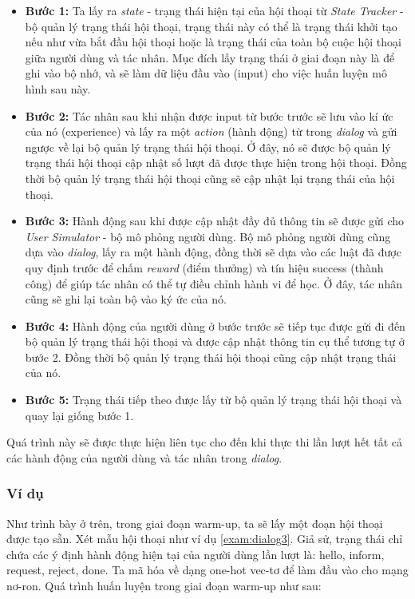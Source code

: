 \begin{itemize}
    \item \textbf{Bước 1:} Ta lấy ra \textit{state} - trạng thái hiện tại của hội thoại từ \textit{State Tracker} - bộ quản lý trạng thái hội thoại, trạng thái này có thể là trạng thái khởi tạo nếu như vừa bắt đầu hội thoại hoặc là trạng thái của toàn bộ cuộc hội thoại giữa người dùng và tác nhân. Mục đích lấy trạng thái ở giai đoạn này là để ghi vào bộ nhớ, và sẽ làm dữ liệu đầu vào (input) cho việc huấn luyện mô hình sau này.
    \item \textbf{Bước 2:} Tác nhân sau khi nhận được input từ bước trước sẽ lưu vào kí ức của nó (experience) và lấy ra một \textit{action} (hành động) từ trong \textit{dialog} và gửi ngược về lại bộ quản lý trạng thái hội thoại. Ở đây, nó sẽ được bộ quản lý trạng thái hội thoại cập nhật số lượt đã được thực hiện trong hội thoại. Đồng thời bộ quản lý trạng thái hội thoại cũng sẽ cập nhật lại trạng thái của hội thoại.
    \item \textbf{Bước 3:} Hành động sau khi được cập nhật đầy đủ thông tin sẽ được gửi cho \textit{User Simulator} - bộ mô phỏng người dùng. Bộ mô phỏng người dùng cũng dựa vào \textit{dialog}, lấy ra một hành động, đồng thời sẽ dựa vào các luật đã được quy định trước để chấm \textit{reward} (điểm thưởng) và tín hiệu success (thành công) để giúp tác nhân có thể tự điều chỉnh hành vi để học. Ở đây, tác nhân cũng sẽ ghi lại toàn bộ vào ký ức của nó.
    \item \textbf{Bước 4:} Hành động của người dùng ở bước trước sẽ tiếp tục được gửi đi đến bộ quản lý trạng thái hội thoại và được cập nhật thông tin cụ thể tương tự ở bước 2. Đồng thời bộ quản lý trạng thái hội thoại cũng cập nhật trạng thái của nó.
    \item \textbf{Bước 5:} Trạng thái tiếp theo được lấy từ bộ quản lý trạng thái hội thoại và quay lại giống bước 1.
\end{itemize}

Quá trình này sẽ được thực hiện liên tục cho đến khi thực thi lần lượt hết tất cả các hành động của người dùng và tác nhân trong \textit{dialog}.

\subsubsection{Ví dụ}
Như trình bày ở trên, trong giai đoạn warm-up, ta sẽ lấy một đoạn hội thoại được tạo sẵn. Xét mẫu hội thoại như ví dụ \ref{exam:dialog3}. Giả sử, trạng thái chỉ chứa các ý định hành động hiện tại của người dùng lần lượt là: hello, inform, request, reject, done. Ta mã hóa về dạng one-hot vec-tơ để làm đầu vào cho mạng nơ-ron. Quá trình huấn luyện trong giai đoạn warm-up như sau:

